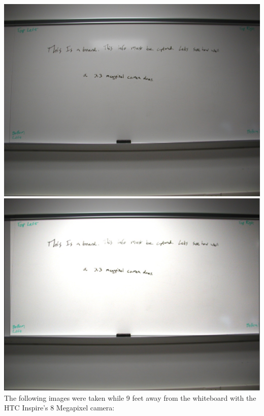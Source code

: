 \documentclass[]{article}
\begin{document}
		\includegraphics{images/UnmodifiedClose.jpg} \\
		\includegraphics{images/ModifiedClose.jpg} \\
		
		The following images were taken while 9 feet away from the whiteboard with the HTC Inspire's 8 Megapixel camera: 
		
\end{document}

